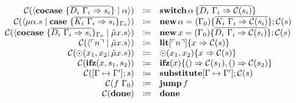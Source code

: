 \[\begin{array}{rcll}
    \collapse{\cut{\cocase{\overline{D_i\ \Gamma_i \Rightarrow s_i}}}{\alpha}} & \coloneq & \switch{\alpha}{\bra{\overline{D_i\ \Gamma_i \Rightarrow \collapse{s_i}}}} & \\
    \collapse{\cut{\mu\alpha.s}{\case{\overline{K_i\ \Gamma_i \Rightarrow s_i}}_{\Gamma_0}}} & \coloneq & \new{\alpha}{(\Gamma_0)\bra{\overline{K_i\ \Gamma_i \Rightarrow \collapse{s_i}}}}{\collapse{s}} & \\
    \collapse{\cut{\cocase{\overline{D_i\ \Gamma_i \Rightarrow s_i}}_{\Gamma_0}}{\tilde{\mu}x.s}} & \coloneq & \new{x}{(\Gamma_0)\bra{\overline{D_i\ \Gamma_i \Rightarrow \collapse{s_i}}}}{\collapse{s}} & \\
    \collapse{\cut{\lit{n}}{\tilde{\mu}x.s}} & \coloneq & \litac{n}{x}{\collapse{s}} & \\
    \collapse{\odot(x_1, x_2; \tilde{\mu}x.s)} & \coloneq & \opac{x_1, x_2}{x}{\collapse{s}} & \\
    \collapse{\ifz{x}{s_1}{s_2}} & \coloneq & \ifzac{x}{\collapse{s_1}}{\collapse{s_2}} & \\
    \collapse{\substitute{\Gamma \mapsto \Gamma^{\prime}}{s}} & \coloneq & \substituteac{\Gamma \mapsto \Gamma^{\prime}}{\collapse{s}} & \\
    \collapse{f\ \Gamma_0} & \coloneq & \jump{f} & \\
    \collapse{\done} & \coloneq & \done & \\
  \end{array}
\]
